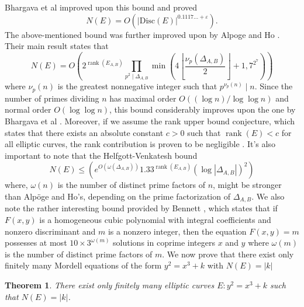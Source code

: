 \documentclass[12pt]{amsart}
\theoremstyle{plain}
\newtheorem{thm}{Theorem}
\theoremstyle{definition}
\theoremstyle{remark}
\numberwithin{equation}{section}
\numberwithin{thm}{section}
\theoremstyle{named}
\theoremstyle{named}
\begin{document}
{Bhargava et al} \cite{bhargava2017bounds} improved upon this bound and proved  $$N(E) = O(\left| \text{Disc}(E) \right|^{0.1117... + \varepsilon}).$$ The above-mentioned bound was further improved upon
by {Alpoge and Ho} \cite{alpöge2022second}. Their main result states that $$ N(E) = 
O\left(2^{\operatorname{rank}\left(E_{A, B}\right)} \prod_{p^2 \mid \Delta_{A, B}} \min \left(4\left\lfloor\frac{\nu_{p}\left(\Delta_{A, B}\right)}{2}\right\rfloor+1,7^{2^7}\right)\right)
$$
where $\nu_{p}(n)$ is the greatest nonnegative integer such that $p^{\nu_{p}(n)} \mid n$. Since the number of primes dividing $n$ has maximal order $O((\log n) / \log \log n)$ and normal order $O(\log \log n)$, this bound considerably improves upon the one by {Bhargava et al} \cite{bhargava2017bounds}. Moreover, if we assume the rank upper bound conjecture, which states that there exists an absolute constant $c>0$ such that $\operatorname{rank}\left(E\right)<c$ for all elliptic curves, the rank contribution is proven to be negligible \cite{458342}. It's also important to note that the{ Helfgott-Venkatesh bound} \cite{helfgott2005integral}
$$
N(E) \le  \left(e^{O\left(\omega\left(\Delta_{A, B}\right)\right)} 1.33^{\operatorname{rank}\left(E_{A, B}\right)}\left(\log \left|\Delta_{A, B}\right|\right)^2 \right)
$$
where, $\omega(n)$ is the number of distinct prime factors of $n$, might be stronger than Alpöge and Ho's, depending on the prime factorization of $\Delta_{A, B}$. We also note the rather interesting bound provided by {Bennett} \cite{Bennett_2015}, which states that if $F(x, y)$ is a homogeneous cubic polynomial with integral coefficients and nonzero discriminant and $m$ is a nonzero integer, then the equation $F(x, y) = m$ possesses at most $10 \times 3^{\omega(m)}$ solutions in coprime integers $x$ and $y$ where $\omega(m)$ is the number of distinct prime factors of $m$. We now prove that there exist only finitely many Mordell equations of the form $y^2 = x^3 + k $ with $N(E) = |k|$
\begin{thm}
    There exist only finitely many elliptic curves $E: y^2 = x^3 + k$ such that $N(E)=|k|$.
\end{thm}
\end{document}
